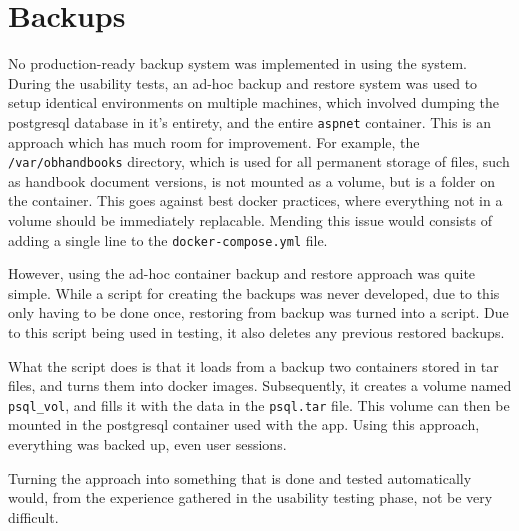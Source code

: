 \section{Backups}
No production-ready backup system was implemented in using the system.
During the usability tests, an ad-hoc backup and restore system was used to setup identical environments on multiple machines, which involved dumping the postgresql database in it's entirety, and the entire \texttt{aspnet} container.
This is an approach which has much room for improvement.
For example, the \texttt{/var/obhandbooks} directory, which is used for all permanent storage of files, such as handbook document versions, is not mounted as a volume, but is a folder on the container.
This goes against best docker practices, where everything not in a volume should be immediately replacable.
Mending this issue would consists of adding a single line to the \texttt{docker-compose.yml} file.

However, using the ad-hoc container backup and restore approach was quite simple.
While a script for creating the backups was never developed, due to this only having to be done once, restoring from backup was turned into a script.
Due to this script being used in testing, it also deletes any previous restored backups.

What the script does is that it loads from a backup two containers stored in tar files, and turns them into docker images.
Subsequently, it creates a volume named \texttt{psql_vol}, and fills it with the data in the \texttt{psql.tar} file.
This volume can then be mounted in the postgresql container used with the app.
Using this approach, everything was backed up, even user sessions.

Turning the approach into something that is done and tested automatically would, from the experience gathered in the usability testing phase, not be very difficult.
